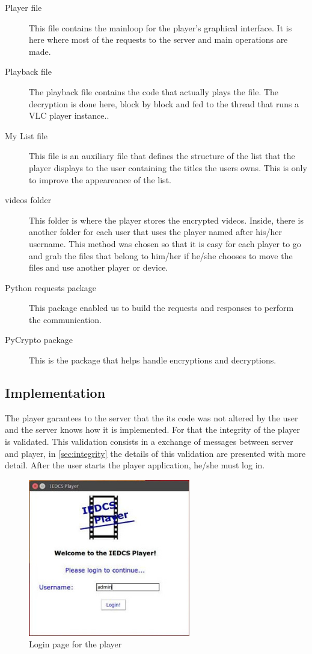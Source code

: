 \documentclass[11pt,a4paper]{report}
\begin{document}
\begin{description}
  \item[Player file] This file contains the mainloop for the player's graphical interface. It is here where most of the requests to the server and main operations are made.
  \item[Playback file] The playback file contains the code that actually plays the file. The decryption is done here, block by block and fed to the thread that runs a VLC player instance..
  \item[My List file] This file is an auxiliary file that defines the structure of the list that the player displays to the user containing the titles the users owns. This is only to improve the appeareance of the list.
  \item[videos folder] This folder is where the player stores the encrypted videos. Inside, there is another folder for each user that uses the player named after his/her username. This method was chosen so that it is easy for each player to go and grab the files that belong to him/her if he/she chooses to move the files and use another player or device.
  \item[Python requests package] This package enabled us to build the requests and responses to perform the communication.
  \item[PyCrypto package] This is the package that helps handle encryptions and decryptions.
\end{description}

\subsection{Implementation}

The player garantees to the server that the its code was not altered by the user and the server knows how it is implemented. For that the integrity of the player is validated. This validation consists in a exchange of messages between server and player, in \autoref{sec:integrity} the details of this validation are presented with more detail.
After the user starts the player application, he/she must log in. 

\begin{figure}[H]
\centerline{\includegraphics[width=200pt]{images/playerLogin.jpg}}
\caption{Login page for the player}
\label{player}
\end{figure}
\end{document}
